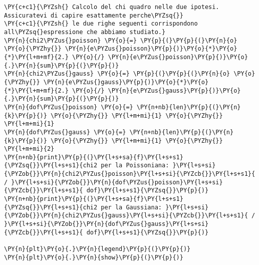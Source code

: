 \begin{Verbatim}[label=\makebox{\href{https://github.com/unipi-physics-labs/lab1-sheets/tree/main/snippy/dad_conteggi.py}{https://github.com/.../dad\_conteggi.py}},commandchars=\\\{\}]
\PY{c+c1}{\PYZsh{} Calcolo del chi quadro nelle due ipotesi. Assicuratevi di capire esattamente perche\PYZsq{}}
\PY{c+c1}{\PYZsh{} le due righe seguenti corrispondono all\PYZsq{}espressione che abbiamo studiato.}
\PY{n}{chi2\PYZus{}poisson} \PY{o}{=} \PY{p}{(}\PY{p}{(}\PY{n}{o} \PY{o}{\PYZhy{}} \PY{n}{e\PYZus{}poisson}\PY{p}{)}\PY{o}{*}\PY{o}{*}\PY{l+m+mf}{2.} \PY{o}{/} \PY{n}{e\PYZus{}poisson}\PY{p}{)}\PY{o}{.}\PY{n}{sum}\PY{p}{(}\PY{p}{)}
\PY{n}{chi2\PYZus{}gauss} \PY{o}{=} \PY{p}{(}\PY{p}{(}\PY{n}{o} \PY{o}{\PYZhy{}} \PY{n}{e\PYZus{}gauss}\PY{p}{)}\PY{o}{*}\PY{o}{*}\PY{l+m+mf}{2.} \PY{o}{/} \PY{n}{e\PYZus{}gauss}\PY{p}{)}\PY{o}{.}\PY{n}{sum}\PY{p}{(}\PY{p}{)}
\PY{n}{dof\PYZus{}poisson} \PY{o}{=} \PY{n+nb}{len}\PY{p}{(}\PY{n}{k}\PY{p}{)} \PY{o}{\PYZhy{}} \PY{l+m+mi}{1} \PY{o}{\PYZhy{}} \PY{l+m+mi}{1}
\PY{n}{dof\PYZus{}gauss} \PY{o}{=} \PY{n+nb}{len}\PY{p}{(}\PY{n}{k}\PY{p}{)} \PY{o}{\PYZhy{}} \PY{l+m+mi}{1} \PY{o}{\PYZhy{}} \PY{l+m+mi}{2}
\PY{n+nb}{print}\PY{p}{(}\PY{l+s+sa}{f}\PY{l+s+s1}{\PYZsq{}}\PY{l+s+s1}{chi2 per la Poissoniana: }\PY{l+s+si}{\PYZob{}}\PY{n}{chi2\PYZus{}poisson}\PY{l+s+si}{\PYZcb{}}\PY{l+s+s1}{ / }\PY{l+s+si}{\PYZob{}}\PY{n}{dof\PYZus{}poisson}\PY{l+s+si}{\PYZcb{}}\PY{l+s+s1}{ dof}\PY{l+s+s1}{\PYZsq{}}\PY{p}{)}
\PY{n+nb}{print}\PY{p}{(}\PY{l+s+sa}{f}\PY{l+s+s1}{\PYZsq{}}\PY{l+s+s1}{chi2 per la Gaussiana: }\PY{l+s+si}{\PYZob{}}\PY{n}{chi2\PYZus{}gauss}\PY{l+s+si}{\PYZcb{}}\PY{l+s+s1}{ / }\PY{l+s+si}{\PYZob{}}\PY{n}{dof\PYZus{}gauss}\PY{l+s+si}{\PYZcb{}}\PY{l+s+s1}{ dof}\PY{l+s+s1}{\PYZsq{}}\PY{p}{)}

\PY{n}{plt}\PY{o}{.}\PY{n}{legend}\PY{p}{(}\PY{p}{)}
\PY{n}{plt}\PY{o}{.}\PY{n}{show}\PY{p}{(}\PY{p}{)}
\end{Verbatim}
